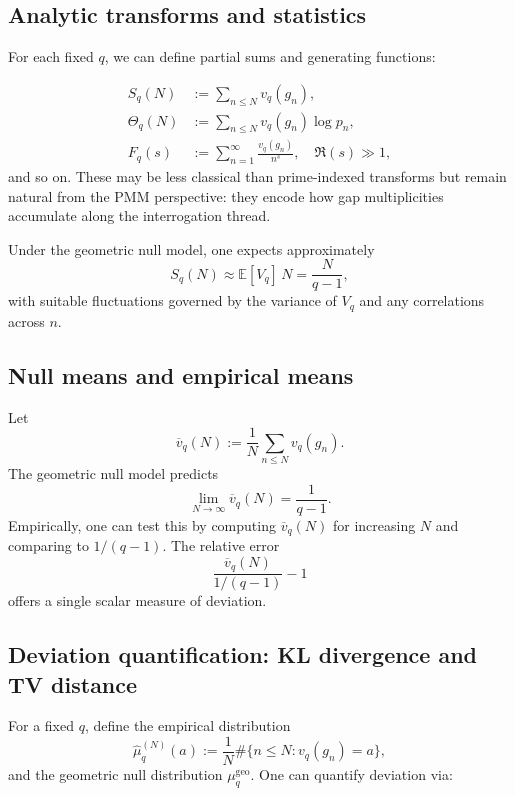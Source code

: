 \documentclass[11pt]{article}
\theoremstyle{definition}
\theoremstyle{plain}
\theoremstyle{remark}
\newcommand{\EE}{\mathbb{E}}
\newcommand{\1}{\mathbb{1}}
\begin{document}
\subsection{Analytic transforms and statistics}

For each fixed \(q\), we can define partial sums and generating functions:

\begin{align*}
  S_q(N) &:= \sum_{n\le N} v_q(g_n),\\
  \Theta_q(N) &:= \sum_{n\le N} v_q(g_n)\log p_n,\\
  F_q(s) &:= \sum_{n=1}^\infty \frac{v_q(g_n)}{n^s},\quad \Re(s)\gg 1,
\end{align*}
and so on. These may be less classical than prime-indexed transforms but remain natural from the PMM perspective: they encode how gap multiplicities accumulate along the interrogation thread.

Under the geometric null model, one expects approximately
\[
  S_q(N) \approx \EE[V_q]\,N = \frac{N}{q-1},
\]
with suitable fluctuations governed by the variance of \(V_q\) and any correlations across \(n\).

\subsection{Null means and empirical means}

Let
\[
  \overline{v}_q(N) := \frac{1}{N}\sum_{n\le N} v_q(g_n).
\]
The geometric null model predicts
\[
  \lim_{N\to\infty} \overline{v}_q(N) = \frac{1}{q-1}.
\]
Empirically, one can test this by computing \(\overline{v}_q(N)\) for increasing \(N\) and comparing to \(1/(q-1)\). The relative error
\[
  \frac{\overline{v}_q(N)}{1/(q-1)} - 1
\]
offers a single scalar measure of deviation.

\subsection{Deviation quantification: KL divergence and TV distance}

For a fixed \(q\), define the empirical distribution
\[
  \hat{\mu}_q^{(N)}(a) := \frac{1}{N}\#\{n\le N : v_q(g_n) = a\},
\]
and the geometric null distribution \(\mu_q^{\mathrm{geo}}\). One can quantify deviation via:
\end{document}

